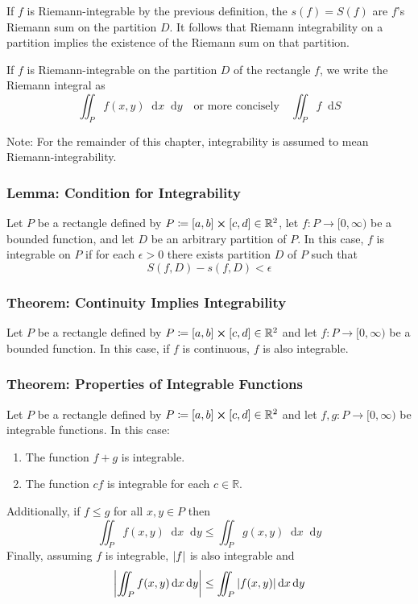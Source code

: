 \documentclass[11pt, a4paper]{article}
\newcommand{\diff}{\mathop{}\!\mathrm{d}} %
\begin{document}
If $ f $ is Riemann-integrable by the previous definition, the $ s(f) = S(f) $ are $ f $'s Riemann sum on the partition $ D $. It follows that Riemann integrability on a partition implies the existence of the Riemann sum on that partition. 

If $ f $ is Riemann-integrable on the partition $ D $ of the rectangle $ f $, we write the Riemann integral as
\begin{equation*}
	\iint_P f(x, y)\diff x \diff y \quad \text{or more concisely} \quad \iint_P f \diff S
\end{equation*}

Note: For the remainder of this chapter, integrability is assumed to mean Riemann-integrability.

\subsubsection{Lemma: Condition for Integrability}
Let $ P $ be a rectangle defined by $P \coloneqq [a, b] \cross [c, d] \in \mathbb{R}^2 $, let $ f : P \rightarrow [0, \infty)$ be a bounded function, and let $ D $ be an arbitrary partition of $ P $. In this case, $ f $ is integrable on $ P $ if for each $ \epsilon > 0 $ there exists partition $ D $ of $ P $ such that
\begin{equation*}
	S(f, D) - s(f, D) < \epsilon
\end{equation*}

\subsubsection{Theorem: Continuity Implies Integrability}
Let $ P $ be a rectangle defined by $P \coloneqq [a, b] \cross [c, d] \in \mathbb{R}^2 $ and let $ f : P \rightarrow [0, \infty)$ be a bounded function. In this case, if $ f $ is continuous, $ f $ is also integrable.

\subsubsection{Theorem: Properties of Integrable Functions}
Let $ P $ be a rectangle defined by $P \coloneqq [a, b] \cross [c, d] \in \mathbb{R}^2 $ and let $ f, g : P \rightarrow [0, \infty)$ be integrable functions. In this case:
\begin{enumerate}
	\item The function $ f + g $ is integrable.
	\item The function $ cf $ is integrable for each $ c \in \mathbb{R} $.
\end{enumerate}
Additionally, if $ f \leq g $ for all $ x, y \in P$ then
\begin{equation*}
	\iint_P f(x, y) \diff x \diff y \leq \iint_P g(x, y) \diff x \diff y 
\end{equation*}
Finally, assuming $ f $ is integrable, $ \abs{f} $ is also integrable and
\begin{equation*}
	\abs{\iint_P f(x, y) \diff x \diff y} \leq \iint_P \abs{f(x, y)} \diff x \diff y
\end{equation*}
\end{document}
